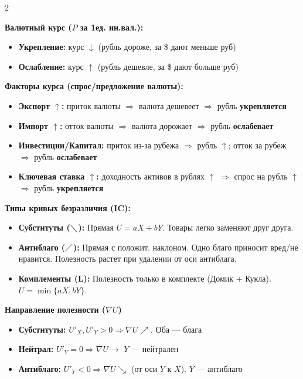\documentclass[14pt,a4paper]{article}
\newenvironment{insep}
	{\noindent\begin{minipage}{\linewidth}}
	{\hspace*{1cm}\end{minipage}}
\begin{document}
\begin{multicols}{2}
\begin{insep}
	\textbf{Валютный курс ($P$ за 1ед. ин.вал.):}
	\begin{itemize} \setlength{\itemsep}{0pt}
		\item \textbf{Укрепление:} курс $\downarrow$ (рубль дороже, за \$ дают меньше руб)
		\item \textbf{Ослабление:} курс $\uparrow$ (рубль дешевле, за \$ дают больше руб)
	\end{itemize}
	
	\textbf{Факторы курса (спрос/предложение валюты):}
	\begin{itemize} \setlength{\itemsep}{0pt}
		\item \textbf{Экспорт $\uparrow$:} приток валюты $\Rightarrow$ валюта дешевеет $\Rightarrow$ рубль \textbf{укрепляется}
		\item \textbf{Импорт $\uparrow$:} отток валюты $\Rightarrow$ валюта дорожает $\Rightarrow$ рубль \textbf{ослабевает}
		\item \textbf{Инвестиции/Капитал:} приток из-за рубежа $\Rightarrow$ рубль $\uparrow$; отток за рубеж $\Rightarrow$ рубль \textbf{ослабевает}
		\item \textbf{Ключевая ставка $\uparrow$:} доходность активов в рублях $\uparrow$ $\Rightarrow$ спрос на рубль $\uparrow$ $\Rightarrow$ рубль \textbf{укрепляется}
	\end{itemize}
\end{insep}

\begin{insep}
	\textbf{Типы кривых безразличия (IC):}
	\begin{itemize} \setlength{\itemsep}{0pt}
		\item \textbf{Субституты ($\diagdown$):} Прямая $U = aX + bY$. Товары легко заменяют друг друга.
		\item \textbf{Антиблаго ($\diagup$):} Прямая с положит. наклоном. Одно благо приносит вред/не нравится. Полезность растет при удалении от оси антиблага.
		\item \textbf{Комплементы (L):} Полезность только в комплекте (Домик + Кукла). $U = \min\{aX, bY\}$.
	\end{itemize}
	
	\textbf{Направление полезности ($\nabla U$)}
	\begin{itemize}
		\item \textbf{Субституты:} $U'_X, U'_Y > 0 \Rightarrow \nabla U \nearrow$. Оба --- блага
		\item \textbf{Нейтрал:} $U'_Y = 0 \Rightarrow \nabla U \rightarrow$ $Y$ --- нейтрален
		\item \textbf{Антиблаго:} $U'_Y < 0 \Rightarrow \nabla U \searrow$ (от оси $Y$ к $X$). $Y$ --- антиблаго
	\end{itemize}
\end{insep}


\end{multicols}
\end{document}
